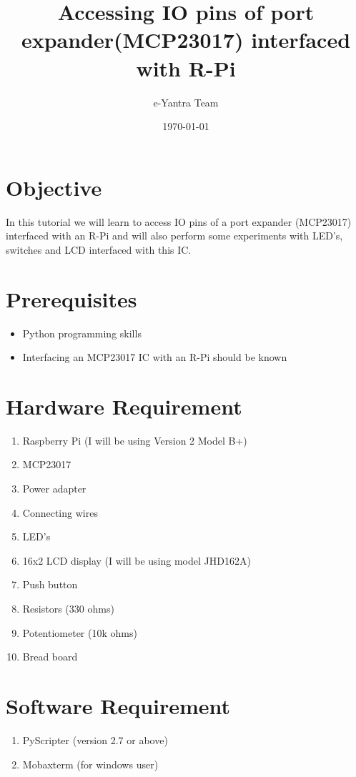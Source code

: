 \documentclass[11pt,a4paper]{article}
\title{Accessing IO pins of port expander(MCP23017) interfaced with R-Pi}
\author{e-Yantra Team}
\date{\today}
\begin{document}
	\maketitle
	\newpage
	\tableofcontents
	\newpage
	\section{Objective}
	In this tutorial we will learn to access IO pins of a port expander (MCP23017) interfaced with an R-Pi and will also perform some experiments with LED's, switches and LCD interfaced with this IC.
	\section{Prerequisites}
	\begin{itemize}
		\item Python programming skills 
		\item Interfacing an MCP23017 IC with an R-Pi should be known
	\end{itemize}
	
	\section{Hardware Requirement}
    \begin{enumerate}
    	\item Raspberry Pi (I will be using Version 2 Model B+)
    	\item MCP23017
    	\item Power adapter
    	\item Connecting wires
    	\item LED's
    	\item 16x2 LCD display (I will be using model JHD162A)
    	\item Push button
    	\item Resistors (330 ohms)
    	\item Potentiometer (10k ohms)
    	\item Bread board
    \end{enumerate}
    
	\section{Software Requirement}
	\begin{enumerate}
		\item PyScripter (version 2.7 or above)
		\item Mobaxterm (for windows user)
	\end{enumerate}
	
\end{document}

